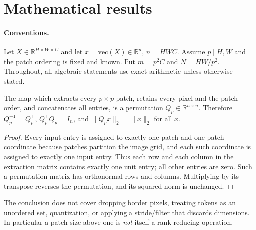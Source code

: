 \section{Mathematical results}\label{sec:theory}
\paragraph{Conventions.} Let $X\in\mathbb R^{H\times W\times C}$ and let $x=\mathrm{vec}(X)\in\mathbb R^n$, $n=HWC$. Assume $p\mid H,W$ and the patch ordering is fixed and known. Put $m=p^2C$ and $N=HW/p^2$. Throughout, all algebraic statements use exact arithmetic unless otherwise stated.

\begin{theorem}\label{thm:reshape}
The map which extracts every $p\times p$ patch, retains every pixel and the patch order, and concatenates all entries, is a permutation $Q_p\in\mathbb R^{n\times n}$. Therefore $Q_p^{-1}=Q_p^\top$, $Q_p^\top Q_p=I_n$, and $\|Q_p x\|_2=\|x\|_2$ for all $x$.
\end{theorem}
\begin{proof}
Every input entry is assigned to exactly one patch and one patch coordinate because patches partition the image grid, and each such coordinate is assigned to exactly one input entry. Thus each row and each column in the extraction matrix contains exactly one unit entry; all other entries are zero. Such a permutation matrix has orthonormal rows and columns. Multiplying by its transpose reverses the permutation, and its squared norm is unchanged.
\end{proof}
The conclusion does not cover dropping border pixels, treating tokens as an unordered set, quantization, or applying a stride/filter that discards dimensions. In particular a patch size above one is \emph{not} itself a rank-reducing operation.

